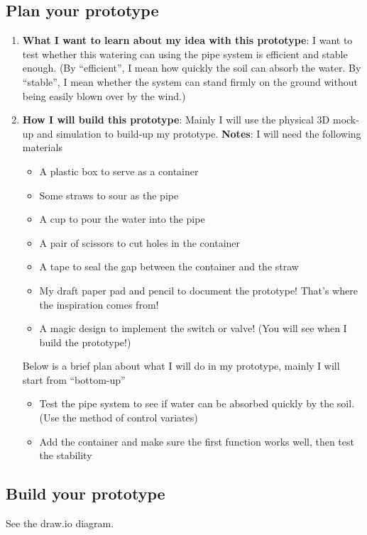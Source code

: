 \documentclass[math,code]{amznotes}
\theoremstyle{remark}
\begin{document}
\subsection{Plan your prototype}
\begin{enumerate}
    \item \textbf{What I want to learn about my idea with this prototype}: I want to test whether this watering can using the pipe system is efficient and stable enough. (By ``efficient'', I mean how quickly the soil can absorb the water. By ``stable'', I mean whether the system can stand firmly on the ground without being easily blown over by the wind.)
    \item \textbf{How I will build this prototype}: Mainly I will use the physical 3D mock-up and simulation to build-up my prototype. \textbf{Notes}: I will need the following materials
    \begin{itemize}
        \item A plastic box to serve as a container
        \item Some straws to sour as the pipe
        \item A cup to pour the water into the pipe
        \item A pair of scissors to cut holes in the container
        \item A tape to seal the gap between the container and the straw
        \item My draft paper pad and pencil to document the prototype! That's where the inspiration comes from!
        \item A magic design to implement the switch or valve! (You will see when I build the prototype!)
    \end{itemize}
    Below is a brief plan about what I will do in my prototype, mainly I will start from ``bottom-up''
    \begin{itemize}
        \item Test the pipe system to see if water can be absorbed quickly by the soil. (Use the method of control variates)
        \item Add the container and make sure the first function works well, then test the stability
    \end{itemize}
\end{enumerate}
\subsection{Build your prototype}
See the draw.io diagram.
\end{document}
